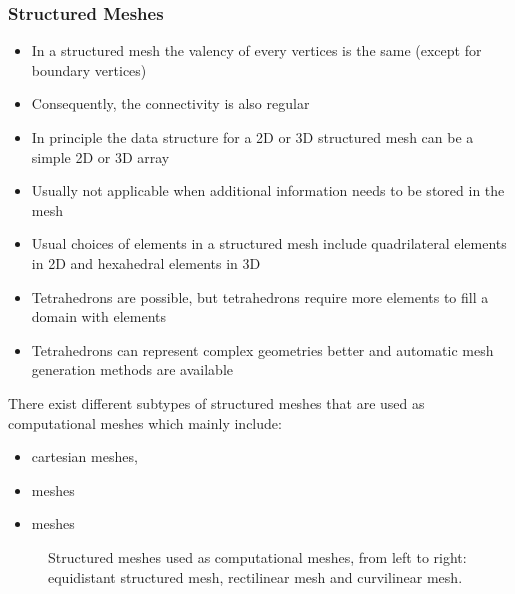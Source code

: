 \begin{frame}
\frametitle{Structured Meshes}
\begin{itemize}
\item In a structured mesh the valency of every vertices is the same (except for boundary vertices)
\item Consequently, the connectivity is also regular
\item In principle the data structure for a 2D or 3D structured mesh can be a simple 2D or 3D array 
\item Usually not applicable when additional information needs to be stored in the mesh
\item Usual choices of elements in a structured mesh include quadrilateral elements in 2D and hexahedral elements in 3D 
\item Tetrahedrons are possible, but tetrahedrons require more elements to fill a domain with elements
\item Tetrahedrons can represent complex geometries better and automatic mesh generation methods are available
\end{itemize}
\end{frame}

\begin{frame}
There exist different subtypes of structured meshes that are used as computational meshes which mainly include:
\begin{itemize}
\item {} cartesian meshes,
\item {} meshes
\item {} meshes 
\end{itemize}
\begin{figure}[h!]
\centering
{}\hspace{0.2cm}
\hspace{0.2cm}
\caption{Structured meshes used as computational meshes, from left to right: equidistant structured mesh, rectilinear mesh and curvilinear mesh.}
\label{fig:structured}
\end{figure}
\end{frame}

